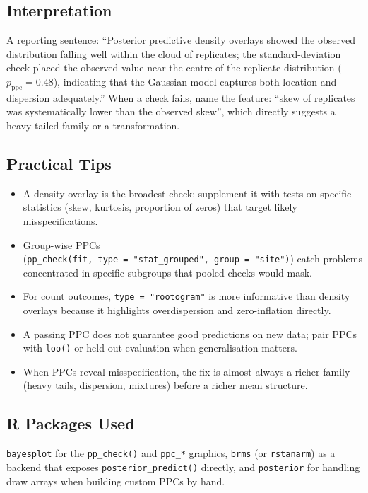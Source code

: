 \documentclass[
]{article}
\providecommand{\tightlist}{%
  \setlength{\itemsep}{0pt}\setlength{\parskip}{0pt}}
\begin{document}
\subsection{Interpretation}\label{interpretation}

A reporting sentence: ``Posterior predictive density overlays showed the
observed distribution falling well within the cloud of replicates; the
standard-deviation check placed the observed value near the centre of
the replicate distribution (\(p_{\text{ppc}} = 0.48\)), indicating that
the Gaussian model captures both location and dispersion adequately.''
When a check fails, name the feature: ``skew of replicates was
systematically lower than the observed skew'', which directly suggests a
heavy-tailed family or a transformation.

\subsection{Practical Tips}\label{practical-tips}

\begin{itemize}
\tightlist
\item
  A density overlay is the broadest check; supplement it with tests on
  specific statistics (skew, kurtosis, proportion of zeros) that target
  likely misspecifications.
\item
  Group-wise PPCs
  (\texttt{pp\_check(fit,\ type\ =\ "stat\_grouped",\ group\ =\ "site")})
  catch problems concentrated in specific subgroups that pooled checks
  would mask.
\item
  For count outcomes, \texttt{type\ =\ "rootogram"} is more informative
  than density overlays because it highlights overdispersion and
  zero-inflation directly.
\item
  A passing PPC does not guarantee good predictions on new data; pair
  PPCs with \texttt{loo()} or held-out evaluation when generalisation
  matters.
\item
  When PPCs reveal misspecification, the fix is almost always a richer
  family (heavy tails, dispersion, mixtures) before a richer mean
  structure.
\end{itemize}

\subsection{R Packages Used}\label{r-packages-used}

\texttt{bayesplot} for the \texttt{pp\_check()} and \texttt{ppc\_*}
graphics, \texttt{brms} (or \texttt{rstanarm}) as a backend that exposes
\texttt{posterior\_predict()} directly, and \texttt{posterior} for
handling draw arrays when building custom PPCs by hand.
\end{document}
